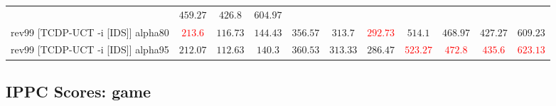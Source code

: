 \documentclass{article}
\begin{document}
\begin{tabular}{|l|r@{$\pm$}rr@{$\pm$}rr@{$\pm$}rr@{$\pm$}rr@{$\pm$}rr@{$\pm$}rr@{$\pm$}rr@{$\pm$}rr@{$\pm$}rr@{$\pm$}r|}
& \multicolumn{2}{c}{$459.27$}
& \multicolumn{2}{c}{$426.8$}
& \multicolumn{2}{c|}{\textbf{$604.97$}}
\\
rev99 [TCDP-UCT -i [IDS]] alpha80
& \multicolumn{2}{c}{\textbf{\textcolor{red}{$213.6$}}}
& \multicolumn{2}{c}{$116.73$}
& \multicolumn{2}{c}{$144.43$}
& \multicolumn{2}{c}{\textbf{$356.57$}}
& \multicolumn{2}{c}{\textbf{$313.7$}}
& \multicolumn{2}{c}{\textbf{\textcolor{red}{$292.73$}}}
& \multicolumn{2}{c}{\textbf{$514.1$}}
& \multicolumn{2}{c}{\textbf{$468.97$}}
& \multicolumn{2}{c}{$427.27$}
& \multicolumn{2}{c|}{\textbf{$609.23$}}
\\
rev99 [TCDP-UCT -i [IDS]] alpha95
& \multicolumn{2}{c}{\textbf{$212.07$}}
& \multicolumn{2}{c}{$112.63$}
& \multicolumn{2}{c}{$140.3$}
& \multicolumn{2}{c}{\textbf{$360.53$}}
& \multicolumn{2}{c}{\textbf{$313.33$}}
& \multicolumn{2}{c}{$286.47$}
& \multicolumn{2}{c}{\textbf{\textcolor{red}{$523.27$}}}
& \multicolumn{2}{c}{\textbf{\textcolor{red}{$472.8$}}}
& \multicolumn{2}{c}{\textbf{\textcolor{red}{$435.6$}}}
& \multicolumn{2}{c|}{\textbf{\textcolor{red}{$623.13$}}}
\\
\hline
\end{tabular}%

\bigskip

\subsection*{IPPC Scores: game}
\end{document}
